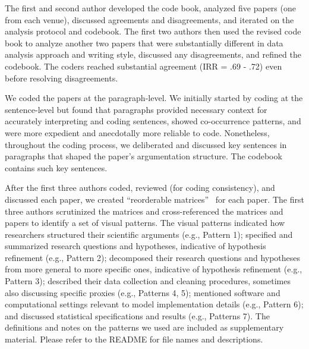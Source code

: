 The first and second author developed the code book, analyzed five papers (one
from each venue), discussed agreements and disagreements, and iterated on the
analysis protocol and codebook. The first two authors then used the revised code
book to analyze another two papers that were substantially different in data
analysis approach and writing style, discussed any disagreements, and refined
the codebook. The coders reached substantial agreement (IRR = .69 - .72) even
before resolving disagreements. 

We coded the papers at the paragraph-level. We initially started by coding at
the sentence-level but found that paragraphs provided necessary context for
accurately interpreting and coding sentences, showed co-occurrence patterns, and
were more expedient and anecdotally more reliable to code. Nonetheless,
throughout the coding process, we deliberated and discussed key sentences in
paragraphs that shaped the paper's argumentation structure. The codebook
contains such key sentences. 

After the first three authors coded, reviewed (for coding consistency), and
discussed each paper, we created ``reorderable
matrices''~\cite{bertin2011graphics} for each paper. The first three authors
scrutinized the matrices and cross-referenced the matrices and papers to
identify a set of visual patterns. The visual patterns indicated how researchers
structured their scientific arguments (e.g., Pattern 1); specified and
summarized research questions and hypotheses, indicative of hypothesis
refinement (e.g., Pattern 2); decomposed their research questions and hypotheses
from more general to more specific ones, indicative of hypothesis refinement
(e.g., Pattern 3); described their data collection and cleaning procedures,
sometimes also discussing specific proxies (e.g., Patterns 4, 5); mentioned
software and computational settings relevant to model implementation details
(e.g., Pattern 6); and discussed statistical specifications and results (e.g.,
Patterns 7). The definitions and notes on the patterns we used are included
as supplementary material. Please refer to the README for file names and
descriptions. 



